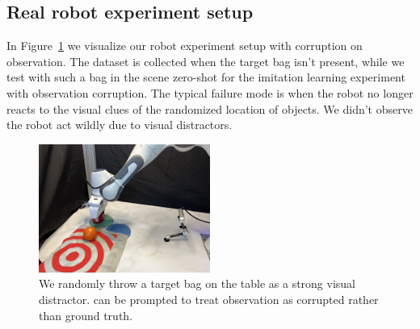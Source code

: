 \subsection{Real robot experiment setup}
In Figure~\ref{fig:robot_currupted} we visualize our robot experiment setup with corruption on observation. The dataset is collected when the target bag isn't present, while we test with such a bag in the scene zero-shot for the imitation learning experiment with observation corruption. The typical failure mode is when the robot no longer reacts to the visual clues of the randomized location of objects. We didn't observe the robot act wildly due to visual distractors.

\begin{figure}[h]
    \centering
    \includegraphics[width=0.5\textwidth]{figures/appendix_vis/robot_corrupt.jpg}
    \caption{We randomly throw a target bag on the table as a strong visual distractor. \algo{} can be prompted to treat observation as corrupted rather than ground truth.}
    \label{fig:robot_currupted}
\end{figure}
